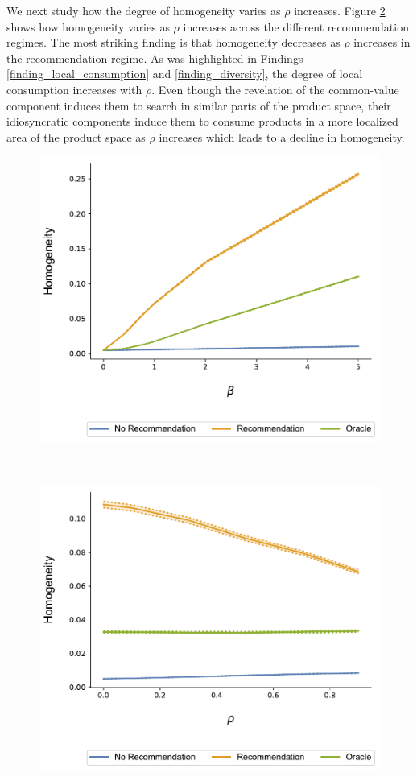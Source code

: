 \documentclass[format=acmsmall, review=false]{acmart}
\begin{document}
\par
We next study how the degree of homogeneity varies as $\rho$ increases. Figure \ref{fig:cor_homo} shows how homogeneity varies as $\rho$ increases across the different recommendation regimes. The most striking finding is that homogeneity decreases as $\rho$ increases in the recommendation regime. As was highlighted in Findings \ref{finding_local_consumption} and \ref{finding_diversity}, the degree of local consumption increases with $\rho$. Even though the revelation of the common-value component induces them to search in similar parts of the product space, their idiosyncratic components induce them to consume products in a more localized area of the product space as $\rho$ increases which leads to a decline in homogeneity.

\begin{figure}[t]
\includegraphics[width=.45\linewidth]{figures/beta_homogeneity_N_200_T_20}
\label{fig:beta_homo}
\end{figure}
~

\begin{figure}[t]
\includegraphics[width=.45\linewidth]{figures/rho_homogeneity_N_200_T_20}
\label{fig:cor_homo}
\end{figure}
\end{document}
